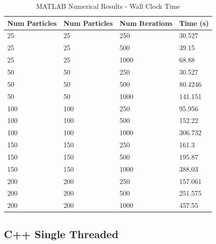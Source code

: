 \begin{table}[H]
    \centering
    \begin{tabular}{@{}llll@{}}
    \toprule
    \textbf{Num Particles} & \textbf{Num Particles} & \textbf{Num Iterations} & \textbf{Time (s)} \\ \midrule
    25            & 25            & 250            & 30.527   \\
    25            & 25            & 500            & 39.15    \\
    25            & 25            & 1000           & 68.88    \\
    50            & 50            & 250            & 30.527   \\
    50            & 50            & 500            & 80.4246  \\
    50            & 50            & 1000           & 141.151  \\
    100           & 100           & 250            & 95.956   \\
    100           & 100           & 500            & 152.22   \\
    100           & 100           & 1000           & 306.732  \\
    150           & 150           & 250            & 161.3    \\
    150           & 150           & 500            & 195.87   \\
    150           & 150           & 1000           & 388.03   \\
    200           & 200           & 250            & 157.061  \\
    200           & 200           & 500            & 251.575  \\
    200           & 200           & 1000           & 457.55   \\ \bottomrule
    \end{tabular}
    \caption{MATLAB Numerical Results - Wall Clock Time}
    \label{tab:MATLAB-speedup}
    \end{table}

\subsection{C++ Single Threaded}


